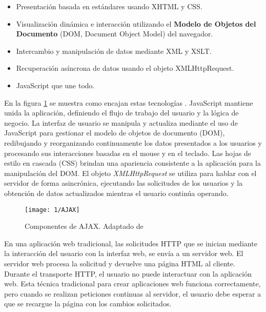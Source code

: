 \begin{itemize}
    \item Presentación basada en estándares usando XHTML y CSS.
    \item Visualización dinámica e interacción utilizando el \textbf{Modelo de Objetos del Documento} (\gls{DOM}, Document Object Model) del navegador. 
	\item  Intercambio y manipulación de datos mediante XML y XSLT.
	\item Recuperación asíncrona de datos usando el objeto \gls{XMLHttpRequest}.
	\item JavaScript que une todo.
\end{itemize}
En la figura \ref{fig:AJAX} se muestra como encajan estas tecnologías .  JavaScript  mantiene unida la aplicación, definiendo el flujo de trabajo del usuario y la lógica de negocio. La interfaz de usuario se manipula y actualiza
mediante el uso de JavaScript para gestionar el modelo de objetos de documento (DOM), redibujando y reorganizando continuamente los datos presentados a los usuarios y procesando sus interacciones basadas en el mouse y en el teclado. Las hojas de estilo en cascada (CSS) brindan una apariencia consistente a la aplicación  para la manipulación  del DOM. El objeto \textit{XMLHttpRequest}  se utiliza para hablar con el servidor de forma asincrónica, ejecutando las solicitudes de los usuarios y la obtención de datos actualizados mientras el usuario continúa operando. 

 \begin{figure} %
	\texttt{[image: 1/AJAX]}
	\caption{Componentes de AJAX. Adaptado de \CP}
	\label{fig:AJAX}
\end{figure}


En una aplicación web tradicional, las solicitudes HTTP que se inician mediante la interacción del usuario con la interfaz web, se envía a un servidor web. El servidor web procesa la solicitud y devuelve una página HTML al cliente. Durante el transporte HTTP, el usuario no puede interactuar con la aplicación web.
Esta técnica tradicional para crear aplicaciones web funciona correctamente, pero cuando se realizan peticiones continuas al servidor, el usuario debe esperar a que se recargue la página con los cambios solicitados.

